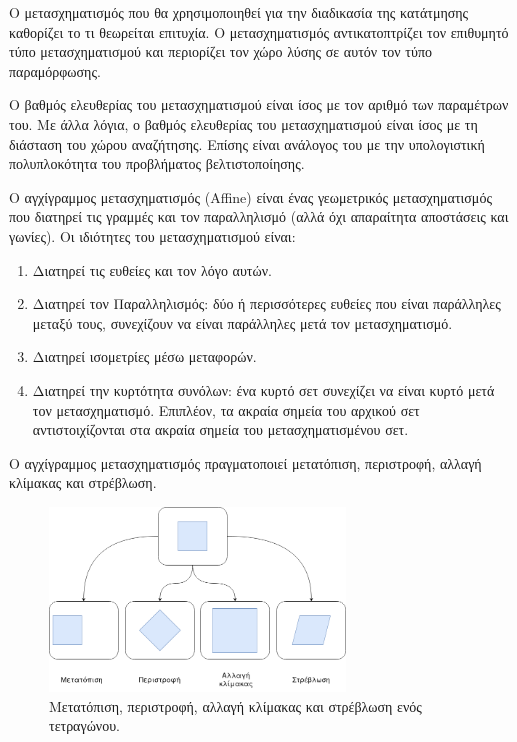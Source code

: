 \documentclass[a4paper,12pt]{article}
\begin{document}
Ο μετασχηματισμός που θα χρησιμοποιηθεί για την διαδικασία της κατάτμησης
καθορίζει το τι θεωρείται επιτυχία. Ο μετασχηματισμός αντικατοπτρίζει τον
επιθυμητό τύπο μετασχηματισμού και περιορίζει τον χώρο λύσης σε αυτόν τον τύπο
παραμόρφωσης.

Ο βαθμός ελευθερίας του μετασχηματισμού είναι ίσος με τον αριθμό των παραμέτρων
του. Με άλλα λόγια, ο βαθμός ελευθερίας του μετασχηματισμού είναι ίσος με τη
διάσταση του χώρου αναζήτησης. Επίσης είναι ανάλογος του με την υπολογιστική
πολυπλοκότητα του προβλήματος βελτιστοποίησης.

Ο αγχίγραμμος μετασχηματισμός (Affine) είναι ένας γεωμετρικός μετασχηματισμός
που διατηρεί τις γραμμές και τον παραλληλισμό (αλλά όχι απαραίτητα αποστάσεις
και γωνίες). Οι ιδιότητες του μετασχηματισμού είναι:

\begin{enumerate}
    \item Διατηρεί τις ευθείες και τον λόγο αυτών.
    \item Διατηρεί τον Παραλληλισμός: δύο ή περισσότερες ευθείες που είναι
        παράλληλες μεταξύ τους, συνεχίζουν να είναι παράλληλες μετά τον
        μετασχηματισμό.
    \item Διατηρεί ισομετρίες μέσω μεταφορών. 
    \item Διατηρεί την κυρτότητα συνόλων: ένα κυρτό σετ συνεχίζει να είναι κυρτό
        μετά τον μετασχηματισμό. Επιπλέον, τα ακραία σημεία του αρχικού σετ
        αντιστοιχίζονται στα ακραία σημεία του μετασχηματισμένου σετ.
\end{enumerate}

Ο αγχίγραμμος μετασχηματισμός πραγματοποιεί μετατόπιση, περιστροφή, αλλαγή
κλίμακας και στρέβλωση.

\begin{figure}[h]
    \centering
    \includegraphics[width=0.7\textwidth]{affine}
    \captionsetup{width=0.7\textwidth}
    \caption{Μετατόπιση, περιστροφή, αλλαγή κλίμακας και στρέβλωση ενός
    τετραγώνου.}
\end{figure}
\end{document}
